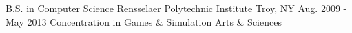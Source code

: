 
\begin{cvedus}

\cvedu
    {B.S. in Computer Science} %
    {Rensselaer Polytechnic Institute} %
    {Troy, NY} %
    {Aug. 2009 - May 2013} %
    {Concentration in Games \& Simulation Arts \& Sciences} %
    {} %
    {} %

\end{cvedus}